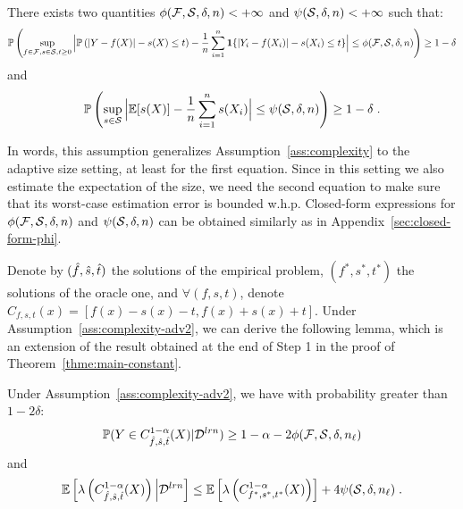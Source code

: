 \begin{assumption} \label{ass:complexity-adv2} There exists two quantities ${\phi(\mathcal{F},{\cal S},\delta,n)}<+\infty$ and ${\psi({\cal S},\delta,n)}<+\infty$ such that:
    \begin{equation*}
        {\mathbb{P}}\left(\sup_{f\in\mathcal{F},s\in{\cal S},t\geq 0}\Big|{\mathbb{P}}\left(|Y-f(X)|-s(X)\leq t \right) - \frac{1}{n}\sum_{i=1}^n\mathbf{1}\{|Y_i-f(X_i)|-s(X_i)\leq t\}\Big|\leq {\phi(\mathcal{F},{\cal S},\delta,n)}\right)\geq 1-\delta
    \end{equation*}
    and
    \begin{equation*}
        {\mathbb{P}}\left(\sup_{s\in{\cal S}}\Big|\mathbb{E}[s(X)] - \frac{1}{n}\sum_{i=1}^n s(X_i)\Big|\leq {\psi({\cal S},\delta,n)}\right)\geq 1-\delta \; .
    \end{equation*}
\end{assumption}

In words, this assumption generalizes Assumption~\ref{ass:complexity} to the adaptive size setting, at least for the first equation. Since in this setting we also estimate the expectation of the size, we need the second equation to make sure that its worst-case estimation error is bounded w.h.p. Closed-form expressions for ${\phi(\mathcal{F},{\cal S},\delta,n)}$ and ${\psi({\cal S},\delta,n)}$ can be obtained similarly as in Appendix~\ref{sec:closed-form-phi}.

Denote by $(\hat{f},\hat{s},\hat{t})$ the solutions of the empirical problem, $(f^*,s^*,t^*)$ the solutions of the oracle one, and $\forall (f,s,t)$, denote $C_{f,s,t}(x)=[f(x)-s(x)-t,f(x)+s(x)+t]$. 
Under Assumption~\ref{ass:complexity-adv2}, we can derive the following lemma, which is an extension of the result obtained at the end of Step 1 in the proof of Theorem~\ref{thme:main-constant}.

\begin{lemma}
    \label{lem:scott-adapv2}
    Under Assumption~\ref{ass:complexity-adv2}, we have with probability greater than $1-2\delta$:    
    \begin{equation}
        \label{eq:lower-scott-app-ADv2}
        {\mathbb{P}}(Y\in C_{\hat{f},\hat{s},\hat{t}}^{1-\alpha}(X)|{\cal D}^{lrn})\geq 1-\alpha - 2{\phi(\mathcal{F},{\cal S},\delta,n_\ell)}
    \end{equation}
    and
    \begin{equation}
        \label{eq:lower-scott-app2-ADv2}
        \mathbb{E}\left[\lambda\left(C_{\hat{f},\hat{s},\hat{t}}^{1-\alpha}(X)\right)\Big|{\cal D}^{lrn}\right] \leq \mathbb{E}\left[\lambda\left(C_{f^*,s^*,t^*}^{1-\alpha}(X)\right)\right] + 4{\psi({\cal S},\delta,n_\ell)}\;.
    \end{equation}
\end{lemma}

